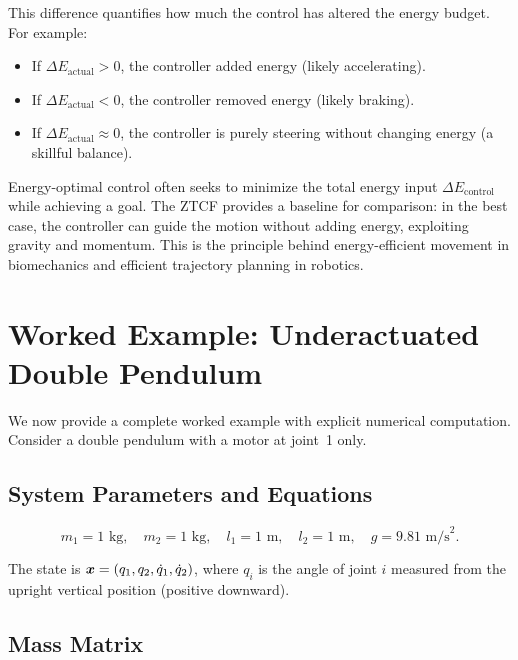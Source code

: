 This difference quantifies how much the control has altered the energy budget. For example:
\begin{itemize}
\item If $\Delta E_{\text{actual}} > 0$, the controller added energy (likely accelerating).
\item If $\Delta E_{\text{actual}} < 0$, the controller removed energy (likely braking).
\item If $\Delta E_{\text{actual}} \approx 0$, the controller is purely steering without
      changing energy (a skillful balance).
\end{itemize}

\begin{designbox}
Energy-optimal control often seeks to minimize the total energy input $\Delta E_{\text{control}}$
while achieving a goal. The ZTCF provides a baseline for comparison: in the best case, the
controller can guide the motion without adding energy, exploiting gravity and momentum. This
is the principle behind energy-efficient movement in biomechanics and efficient trajectory
planning in robotics.
\end{designbox}

\section{Worked Example: Underactuated Double Pendulum}
\label{sec:ch7:double-pendulum-full}

We now provide a complete worked example with explicit numerical computation. Consider a
double pendulum with a motor at joint~1 only.

\subsection{System Parameters and Equations}

\begin{equation}
m_1 = 1 \text{ kg}, \quad m_2 = 1 \text{ kg}, \quad l_1 = 1 \text{ m}, \quad l_2 = 1 \text{ m}, \quad g = 9.81 \text{ m/s}^2.
\label{eq:ch7:double-pend-params}
\end{equation}

The state is $\bm{x} = (q_1, q_2, \dot{q}_1, \dot{q}_2)$, where $q_i$ is the angle of joint $i$
measured from the upright vertical position (positive downward).

\subsection{Mass Matrix}

